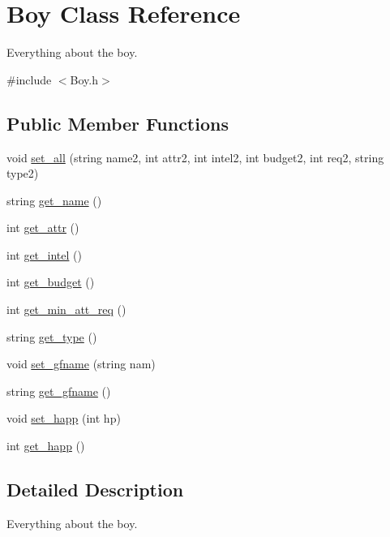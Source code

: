 \hypertarget{classBoy}{}\section{Boy Class Reference}
\label{classBoy}


Everything about the boy.  




{\ttfamily \#include $<$Boy.\+h$>$}

\subsection*{Public Member Functions}
\begin{DoxyCompactItemize}
\item 
void \hyperlink{classBoy_a4a2303961bc7e23c2e19a4781277d088}{set\+\_\+all} (string name2, int attr2, int intel2, int budget2, int req2, string type2)
\item 
string \hyperlink{classBoy_a38e4b40846c88387e33eabdb7cfda958}{get\+\_\+name} ()
\item 
int \hyperlink{classBoy_a37fb6a59cc1471410759526dcf2abb06}{get\+\_\+attr} ()
\item 
int \hyperlink{classBoy_ae3cfbdc28b8cad1e6bdc8f06e49e6903}{get\+\_\+intel} ()
\item 
int \hyperlink{classBoy_a32916b400448215ba0c4ad8e1061def9}{get\+\_\+budget} ()
\item 
int \hyperlink{classBoy_acd81d7c6e595d05d5a25b9a9b6c3345b}{get\+\_\+min\+\_\+att\+\_\+req} ()
\item 
string \hyperlink{classBoy_ac3bb7d0ef3638d92e64d71809a84ebaa}{get\+\_\+type} ()
\item 
void \hyperlink{classBoy_ac9140aff9675e4e4a2cd2980d65ab0ca}{set\+\_\+gfname} (string nam)
\item 
string \hyperlink{classBoy_a468063de535334e0174fc87a803cd925}{get\+\_\+gfname} ()
\item 
void \hyperlink{classBoy_a35d39276b1dd950d952901c7aa4176b9}{set\+\_\+happ} (int hp)
\item 
int \hyperlink{classBoy_ad6ef5e1b1743304b61080a0e1ffda56f}{get\+\_\+happ} ()
\end{DoxyCompactItemize}


\subsection{Detailed Description}
Everything about the boy. 

